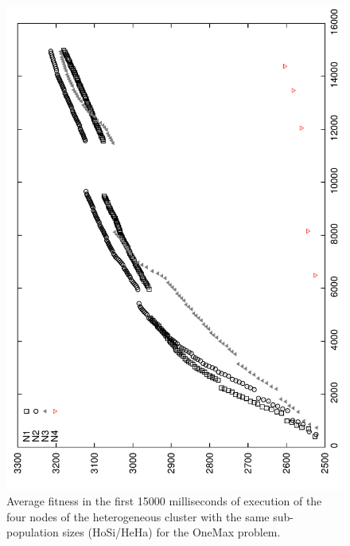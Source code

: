 \begin{figure}
\centering 
\includegraphics[angle=-90,scale =0.4] {gfx/adaptiveresults/generationsONEMAXhomosize.pdf}
\caption{Average fitness in the first 15000 milliseconds of execution of the four nodes of the heterogeneous cluster with the same sub-population sizes (HoSi/HeHa) for the OneMax problem.}
\label{fig:gensonemaxhomosize}
\end{figure}


